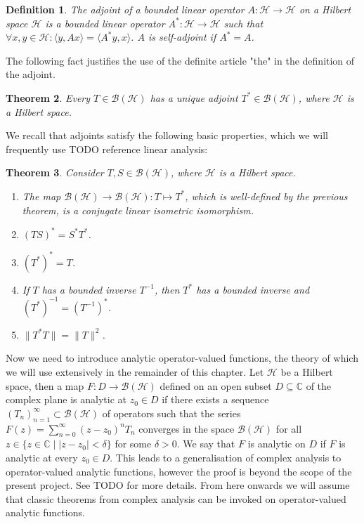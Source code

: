 \documentclass[12pt,oneside]{report}
\newtheorem{thm}{Theorem}[chapter]
\newtheorem{defn}[thm]{Definition}
\begin{document}
\begin{defn}
    The adjoint of a bounded linear operator $A: \mathscr{H} \to \mathscr{H}$ on a Hilbert space $\mathscr{H}$ is a bounded linear operator $A^{*}: \mathscr{H} \to \mathscr{H}$ such that $\forall x,y \in \mathscr{H}: \langle y,Ax \rangle = \langle A^{*}y, x \rangle$. $A$ is self-adjoint if $A^{*} = A$.
\end{defn}

The following fact justifies the use of the definite article "the" in the definition of the adjoint.

\begin{thm}
    Every $T \in \mathscr{B}(\mathscr{H})$ has a unique adjoint $T^{*} \in \mathscr{B}(\mathscr{H})$, where $\mathscr{H}$ is a Hilbert space.
\end{thm}

We recall that adjoints satisfy the following basic properties, which we will frequently use TODO reference linear analysis:

\begin{thm}
    Consider $T, S \in \mathscr{B}(\mathscr{H})$, where $\mathscr{H}$ is a Hilbert space.
    \begin{enumerate}
        \item[a)] The map $\mathscr{B}(\mathscr{H}) \to \mathscr{B}(\mathscr{H}): T \mapsto T^{*}$, which is well-defined by the previous theorem, is a conjugate linear isometric isomorphism.
        \item[b)] $(TS)^{*} = S^{*}T^{*}$.
        \item[c)] $(T^{*})^{*} = T$.
        \item[d)] If $T$ has a bounded inverse $T^{-1}$, then $T^{*}$ has a bounded inverse and $(T^{*})^{-1} = (T^{-1})^{*}$.
        \item[e)] $\|T^{*}T\| = \|T\|^{2}$.
    \end{enumerate}
\end{thm}

Now we need to introduce analytic operator-valued functions, the theory of which we will use extensively in the remainder of this chapter. Let $\mathscr{H}$ be a Hilbert space, then a map $F: D \to \mathscr{B}(\mathscr{H})$ defined on an open subset $D \subseteq \mathbb{C}$ of the complex plane is analytic at $z_{0} \in D$ if there exists a sequence $(T_{n})_{n=1}^{\infty} \subset \mathscr{B}(\mathscr{H})$ of operators such that the series $F(z) = \sum_{n=0}^{\infty} (z - z_{0})^{n}T_{n}$ converges in the space $\mathscr{B}(\mathscr{H})$ for all $z \in \{ z \in \mathbb{C} \; | \; |z - z_{0}| < \delta \}$ for some $\delta > 0$. We say that $F$ is analytic on $D$ if $F$ is analytic at every $z_{0} \in D$. This leads to a generalisation of complex analysis to operator-valued analytic functions, however the proof is beyond the scope of the present project. See TODO for more details. From here onwards we will assume that classic theorems from complex analysis can be invoked on operator-valued analytic functions.
\end{document}
